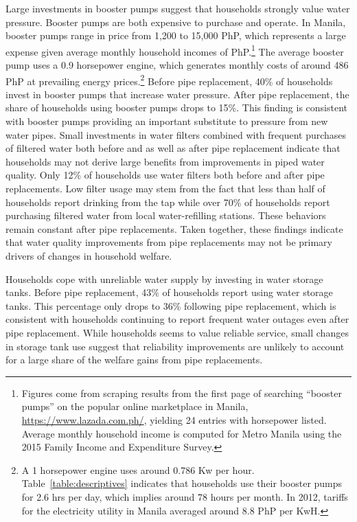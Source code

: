 \documentclass[12pt,table]{article}
\begin{document}
Large investments in booster pumps suggest that households strongly value water pressure.  Booster pumps are both expensive to purchase and operate. In Manila, booster pumps range in price from 1,200 to 15,000 PhP, which represents a large expense given average monthly household incomes of PhP.\footnote{Figures come from scraping results from the first page of searching ``booster pumps'' on the popular online marketplace in Manila, \url{https://www.lazada.com.ph/},  yielding 24 entries with horsepower listed.  Average monthly household income is computed for Metro Manila using the 2015 Family Income and Expenditure Survey.}  The average booster pump uses a 0.9 horsepower engine, which generates monthly costs of around 486 PhP at prevailing energy prices.\footnote{A 1 horsepower engine uses around 0.786 Kw per hour.  Table~\ref{table:descriptives} indicates that households use their booster pumps for 2.6 hrs per day, which implies around 78 hours per month.  In 2012, tariffs for the electricity utility in Manila averaged around 8.8 PhP per KwH.}   Before pipe replacement, 40\% of households invest in booster pumps that increase water pressure.  After pipe replacement, the share of households using booster pumps drops to 15\%.  This finding is consistent with booster pumps providing an important substitute to pressure from new water pipes.
Small investments in water filters combined with frequent purchases of filtered water both before and as well as after pipe replacement indicate that households may not derive large benefits from improvements in piped water quality.  Only 12\% of households use water filters both before and after pipe replacements.  Low filter usage may stem from the fact that less than half of households report drinking from the tap while over 70\% of households report purchasing filtered water from local water-refilling stations.  These behaviors remain constant after pipe replacements.  Taken together, these findings indicate that water quality improvements from pipe replacements may not be primary drivers of changes in household welfare.

Households cope with unreliable water supply by investing in water storage tanks.  Before pipe replacement, 43\% of households report using water storage tanks.  This percentage only drops to 36\% following pipe replacement, which is consistent with households continuing to report frequent water outages even after pipe replacement.  While households seems to value reliable service, small changes in storage tank use suggest that reliability improvements are unlikely to account for a large share of the welfare gains from pipe replacements.
\end{document}
